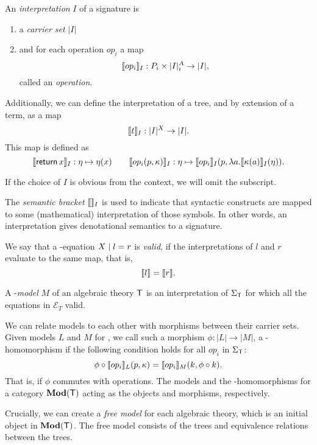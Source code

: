 \begin{definition}[Interpretation]
    An \emph{interpretation} $I$ of a signature \Sig is
    \begin{enumerate}
    \item a \emph{carrier set} $|I|$
    \item and for each operation $op_i$ a map
        \[ \llbracket op_i\rrbracket_I : P_i \times |I|^A_i \to |I|, \]
        called an \emph{operation}.
    \end{enumerate}
    Additionally, we can define the interpretation of a tree, and by extension of a term, as a map
    \[ \llbracket t\rrbracket_I : |I|^X \to |I|. \]
    This map is defined as
    \[
        \llbracket\operatorname{\mathsf{return}} x\rrbracket_I : \eta \mapsto \eta(x)
        \qquad
        \llbracket op_i(p,\kappa)\rrbracket_I : \eta \mapsto \llbracket op_i\rrbracket_I(p, \lambda a. \llbracket\kappa(a)\rrbracket_I(\eta)).
    \]
\end{definition}

If the choice of $I$ is obvious from the context, we will omit the subscript.

The \emph{semantic bracket} $\llbracket\rrbracket_I$ is used to indicate that syntactic constructs are mapped to some (mathematical) interpretation of those symbols. In other words, an interpretation gives denotational semantics to a signature.

\begin{definition}[Model]
    We say that a \Sig-equation $X \;|\; l = r$ is \emph{valid}, if the interpretations of $l$ and $r$ evaluate to the same map, that is,
    \[ \llbracket l\rrbracket = \llbracket r\rrbracket. \]

    A \T-\emph{model} $M$ of an algebraic theory $\mathsf{T}$ is an interpretation of $\Sigma_\mathsf{T}$ for which all the equations in $\mathcal{E}_T$ valid.
\end{definition}

We can relate models to each other with morphisms between their carrier sets. Given models $L$ and $M$ for \T, we call such a morphism $\phi : |L| \to |M|$, a \T-homomorphism if the following condition holds for all $op_i$ in $\Sigma_\mathsf{T}$:
\[ \phi \circ \llbracket op_i\rrbracket_L(p, \kappa) = \llbracket op_i\rrbracket_M(k, \phi \circ k). \]
That is, if $\phi$ commutes with operations. The models and the \T-homomorphisms for a category $\mathbf{Mod}(\mathsf{T})$ acting as the objects and morphisms, respectively.

Crucially, we can create a \emph{free model} for each algebraic theory, which is an initial object in $\mathbf{Mod}(\mathsf{T})$. The free model consists of the trees and equivalence relations between the trees.

